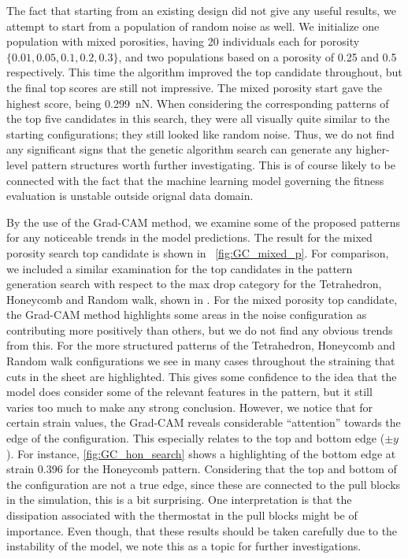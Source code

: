 The fact that starting from an existing design did not give any useful results, we attempt to start from a population of random noise as well. We initialize one population with mixed porosities, having 20 individuals each for porosity $\{0.01, 0.05, 0.1, 0.2, 0.3\}$, and two populations based on a porosity of 0.25 and 0.5
respectively. This time the algorithm improved the top candidate throughout, but
the final top scores are still not impressive. The mixed porosity start gave the
highest score, being \SI{0.299}{nN}. When considering the corresponding patterns of the top five candidates in this search, they were all visually quite
similar to the starting configurations; they still looked like random noise.
Thus, we do not find any significant signs that the genetic algorithm search can generate any higher-level pattern structures worth further investigating. This is of course likely to be connected with the fact that the machine learning model governing the fitness evaluation is unstable outside orignal data domain.


By the use of the Grad-CAM method, we examine some of the proposed patterns for
any noticeable trends in the model predictions. The result for the mixed
porosity search top candidate is shown in  ~\cref{fig:GC_mixed_p}. For
comparison, we included a similar examination for the top candidates in the
pattern generation search with respect to the max drop category for the
Tetrahedron, Honeycomb and Random walk, shown in
. For the mixed porosity top
candidate, the Grad-CAM method highlights some areas in the noise configuration
as contributing more positively than others, but we do not find any obvious
trends from this. For the more structured patterns of the Tetrahedron, Honeycomb
and Random walk configurations we see in many cases throughout the straining
that cuts in the sheet are highlighted. This gives some confidence to the idea
that the model does consider some of the relevant features in the pattern, but
it still varies too much to make any strong conclusion. However, we notice that
for certain strain values, the Grad-CAM reveals considerable ``attention'' towards the edge of the configuration. This especially relates to the top and bottom edge ($\pm y$). For instance, \cref{fig:GC_hon_search} shows a highlighting of the bottom edge at strain 0.396 for the Honeycomb pattern. Considering that the top and bottom of the configuration are not a true edge, since these are connected to the pull blocks in the simulation, this is a bit surprising. One interpretation is that the dissipation associated with the thermostat in the pull blocks might be of importance. Even though, that these results should be taken carefully due to the instability of the model, we note this as a topic for further investigations. 



